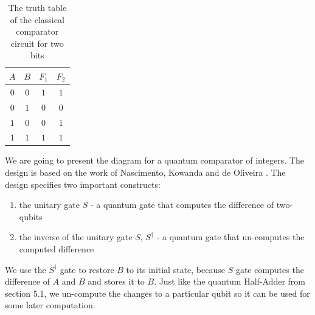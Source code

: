 \begin{table}[ht]
    \centering
    \begin{tabular}{cc|cc}
        $A$ & $B$ & $F_1$ & $F_2$ \\
        \hline
        $0$ & $0$ & $1$ & $1$ \\
        $0$ & $1$ & $0$ & $0$ \\
        $1$ & $0$ & $0$ & $1$ \\
        $1$ & $1$ & $1$ & $1$ \\
    \end{tabular}
    \caption{The truth table of the classical comparator circuit for two bits}
\end{table}
\newpage
We are going to present the diagram for a quantum comparator of integers. The design is based on the work of Nascimento,
Kowanda and de Oliveira \cite{NKO2006}. The design specifies two important constructs:

\begin{enumerate}
    \item the unitary gate $S$ - a quantum gate that computes the difference of two-qubits
    \item the inverse of the unitary gate $S$, $S^\dag$ - a quantum gate that un-computes the computed difference
\end{enumerate}

We use the $S^\dag$ gate to restore $B$ to its initial state, because $S$ gate computes the difference of $A$ and $B$
and stores it to $B$. Just like the quantum Half-Adder from section 5.1, we un-compute the changes to a particular
qubit so it can be used for some later computation.

